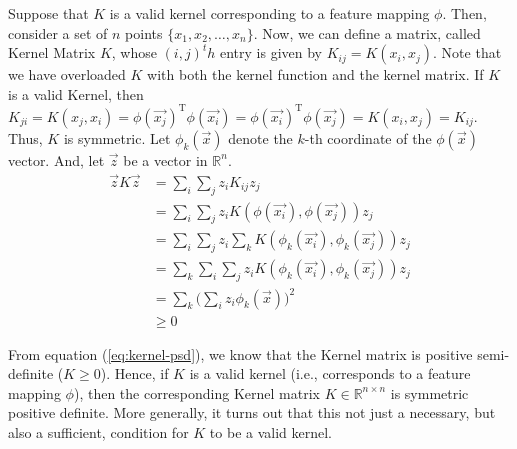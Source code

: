 Suppose that $K$ is a valid kernel corresponding to a feature mapping $\phi$. Then, consider a set of $n$ points $\{x_1, x_2, \dots, x_n\}$. Now, we can define a matrix, called Kernel Matrix $K$, whose $(i,j)^th$ entry is given by $K_{ij} = K(x_i, x_j)$. Note that we have overloaded $K$ with both the kernel function and the kernel matrix.
If $K$ is a valid Kernel, then $K_{ji} = K(x_j, x_i) = \phi(\vec{x_j})^{\text{T}}\phi(\vec{x_i}) = \phi(\vec{x_i})^{\text{T}}\phi(\vec{x_j}) = K(x_i, x_j) = K_{ij}$. Thus, $K$ is symmetric. Let $\phi_k(\vec{x})$ denote the $k$-th coordinate of the $\phi(\vec{x})$ vector. And, let $\vec{z}$ be a vector in $\mathbb{R}^n$.
\begin{align}
	\vec{z}K\vec{z} &= \sum_{i}\sum_{j} z_{i}K_{ij}z_{j} \nonumber \\
&= \sum_{i}\sum_{j} z_{i}K(\phi(\vec{x_i}), \phi(\vec{x_j}))z_{j} \nonumber \\
&= \sum_{i}\sum_{j} z_{i}\sum_{k} K(\phi_k(\vec{x_i}), \phi_k(\vec{x_j}))z_{j} \nonumber \\
&= \sum_{k}\sum_{i}\sum_{j} z_{i}K(\phi_k(\vec{x_i}), \phi_k(\vec{x_j}))z_{j} \nonumber \\
&= \sum_{k} \Bigg(\sum_{i} z_i\phi_{k}(\vec{x})\Bigg)^2 \nonumber \\
&\geq 0 \label{eq:kernel-psd}
\end{align}

From equation (\ref{eq:kernel-psd}), we know that the Kernel matrix is positive semi-definite ($K \geq 0$). Hence, if $K$ is a valid kernel (i.e., corresponds to a feature mapping $\phi$), then the corresponding Kernel matrix $K \in \mathbb{R}^{n\times n}$ is symmetric positive definite. More generally, it turns out that this not just a necessary, but also a sufficient, condition for $K$ to be a valid kernel.  